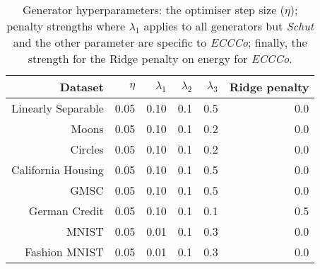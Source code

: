 \begin{table}

\caption{Generator hyperparameters: the optimiser step size ($\eta$); penalty strengths where $\lambda_1$ applies to all generators but \textit{Schut} and the other parameter are specific to \textit{ECCCo}; finally, the strength for the Ridge penalty on energy for \textit{ECCCo}.\label{tab:genparams} \newline}
\centering
\fontsize{8}{10}\selectfont
\begin{tabular}[t]{rrrrrr}
\toprule
Dataset & $\eta$ & $\lambda_1$ & $\lambda_2$ & $\lambda_3$ & Ridge penalty\\
\midrule
Linearly Separable & 0.05 & 0.10 & 0.1 & 0.5 & 0.0\\
Moons & 0.05 & 0.10 & 0.1 & 0.2 & 0.0\\
Circles & 0.05 & 0.10 & 0.1 & 0.2 & 0.0\\
California Housing & 0.05 & 0.10 & 0.1 & 0.5 & 0.0\\
GMSC & 0.05 & 0.10 & 0.1 & 0.5 & 0.0\\
German Credit & 0.05 & 0.10 & 0.1 & 0.1 & 0.5\\
MNIST & 0.05 & 0.01 & 0.1 & 0.3 & 0.0\\
Fashion MNIST & 0.05 & 0.01 & 0.1 & 0.3 & 0.0\\
\bottomrule
\end{tabular}
\end{table}
